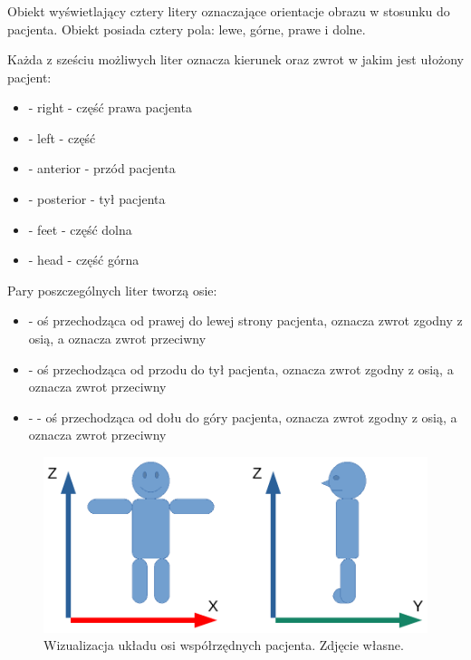 \subsubsection{}

Obiekt wyświetlający cztery litery oznaczające orientacje obrazu w stosunku do pacjenta.
Obiekt posiada cztery pola: lewe, górne, prawe i dolne.

Każda z sześciu możliwych liter oznacza kierunek oraz zwrot w jakim jest ułożony pacjent:
\begin{itemize}
    \item {} - right - część prawa pacjenta
    \item {} - left - część
    \item {} - anterior - przód pacjenta
    \item {} - posterior - tył pacjenta
    \item {} - feet - część dolna
    \item {} - head - część górna
\end{itemize}

Pary poszczególnych liter tworzą osie:
\begin{itemize}
    \item {} - oś przechodząca od prawej do lewej strony pacjenta,  oznacza zwrot zgodny z osią, a  oznacza zwrot przeciwny

    \item {} - oś przechodząca od przodu do tył pacjenta,  oznacza zwrot zgodny z osią, a  oznacza zwrot przeciwny

    \item {} -  - oś przechodząca od dołu do góry pacjenta,  oznacza zwrot zgodny z osią, a  oznacza zwrot przeciwny

\end{itemize}

\begin{figure}[!htbp]
    \centering
    \includegraphics[width=\textwidth]{img/imageorientationindicator-003.pdf}
    \caption{Wizualizacja układu osi współrzędnych pacjenta. Zdjęcie własne.}
    \label{fig:imageorientationindicator2}
\end{figure}

